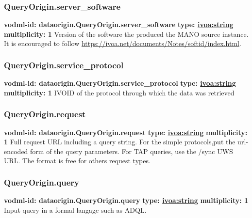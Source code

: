     \subsubsection{QueryOrigin.server_software}
      \textbf{vodml-id: dataorigin.QueryOrigin.server_software} \newline
      \textbf{type: \hyperref[sect:ivoa]{ivoa:string}} \newline
      \textbf{multiplicity: 1} \newline
      Version of the software the produced the MANO source instance. It is encouraged to follow \url{https://ivoa.net/documents/Notes/softid/index.html}.

    \subsubsection{QueryOrigin.service_protocol}
      \textbf{vodml-id: dataorigin.QueryOrigin.service_protocol} \newline
      \textbf{type: \hyperref[sect:ivoa]{ivoa:string}} \newline
      \textbf{multiplicity: 1} \newline
      IVOID of the protocol through which the data was retrieved

    \subsubsection{QueryOrigin.request}
      \textbf{vodml-id: dataorigin.QueryOrigin.request} \newline
      \textbf{type: \hyperref[sect:ivoa]{ivoa:string}} \newline
      \textbf{multiplicity: 1} \newline
      Full request URL including a query string. For the simple protocols,put the url-encoded form of the query parameters. For TAP queries, use the /sync UWS URL. The format is free for others request types.

    \subsubsection{QueryOrigin.query}
      \textbf{vodml-id: dataorigin.QueryOrigin.query} \newline
      \textbf{type: \hyperref[sect:ivoa]{ivoa:string}} \newline
      \textbf{multiplicity: 1} \newline
      Input query in a formal langage such as ADQL.

